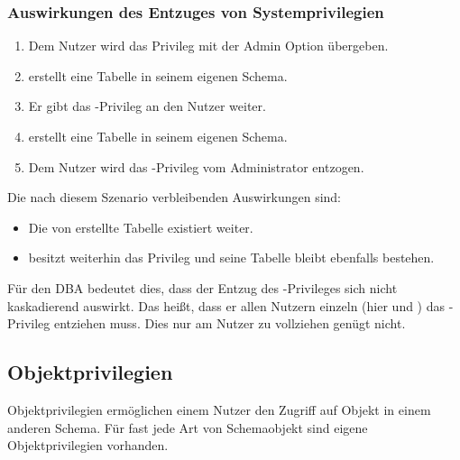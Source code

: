         \subsubsection{Auswirkungen des Entzuges von Systemprivilegien}
          \begin{enumerate}
            \item Dem Nutzer  wird das Privileg  mit der Admin Option übergeben.
            \item {} erstellt eine Tabelle in seinem eigenen Schema.
            \item Er gibt das -Privileg an den Nutzer  weiter.
            \item {} erstellt eine Tabelle in seinem eigenen Schema.
            \item Dem Nutzer  wird das -Privileg vom Administrator entzogen.
          \end{enumerate}
          Die nach diesem Szenario verbleibenden Auswirkungen sind:
          \begin{itemize}
            \item Die von  erstellte Tabelle existiert weiter.
            \item {} besitzt weiterhin das Privileg  und seine Tabelle bleibt ebenfalls bestehen.
          \end{itemize}
          Für den DBA bedeutet dies, dass der Entzug des -Privileges sich nicht kaskadierend auswirkt. Das heißt, dass er allen Nutzern einzeln (hier  und ) das -Privileg entziehen muss. Dies nur am Nutzer  zu vollziehen genügt nicht.
      \subsection{Objektprivilegien}
        \begin{merke}
          Objektprivilegien ermöglichen einem Nutzer den Zugriff auf Objekt in einem anderen Schema. Für fast jede Art von Schemaobjekt sind eigene Objektprivilegien vorhanden.
        \end{merke}
